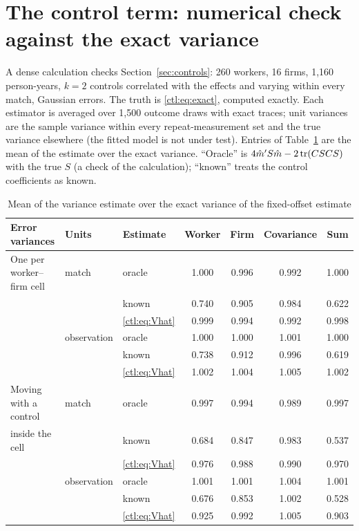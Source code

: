\section{The control term: numerical check against the exact variance}\label{app:ctlnum}

A dense calculation checks Section~\ref{sec:controls}: 260 workers, 16 firms, 1{,}160 person-years, $k=2$ controls
correlated with the effects and varying within every match, Gaussian errors. The truth is \eqref{ctl:eq:exact},
computed exactly. Each estimator is averaged over 1{,}500 outcome draws with exact traces; unit variances are the
sample variance within every repeat-measurement set and the true variance elsewhere (the fitted model is not under
test). Entries of Table~\ref{tab:ctlnum} are the mean of the estimate over the exact variance. ``Oracle'' is
$4\hat m'S\hat m-2\operatorname{tr}(CSCS)$ with the true $S$ (a check of the calculation); ``known'' treats the control
coefficients as known.

\begin{table}[H]
\centering\small
\caption{Mean of the variance estimate over the exact variance of the fixed-offset estimate}\label{tab:ctlnum}
\begin{tabular}{@{}lllcccc@{}}
\toprule
Error variances & Units & Estimate & Worker & Firm & Covariance & Sum \\
\midrule
One per worker--firm cell & match & oracle & 1.000 & 0.996 & 0.992 & 1.000 \\
 & & known & 0.740 & 0.905 & 0.984 & 0.622 \\
 & & \eqref{ctl:eq:Vhat} & 0.999 & 0.994 & 0.992 & 0.998 \\
\addlinespace
 & observation & oracle & 1.000 & 1.000 & 1.001 & 1.000 \\
 & & known & 0.738 & 0.912 & 0.996 & 0.619 \\
 & & \eqref{ctl:eq:Vhat} & 1.002 & 1.004 & 1.005 & 1.002 \\
\addlinespace
Moving with a control & match & oracle & 0.997 & 0.994 & 0.989 & 0.997 \\
\quad inside the cell & & known & 0.684 & 0.847 & 0.983 & 0.537 \\
 & & \eqref{ctl:eq:Vhat} & 0.976 & 0.988 & 0.990 & 0.970 \\
\addlinespace
 & observation & oracle & 1.001 & 1.001 & 1.004 & 1.001 \\
 & & known & 0.676 & 0.853 & 1.002 & 0.528 \\
 & & \eqref{ctl:eq:Vhat} & 0.925 & 0.992 & 1.005 & 0.903 \\
\bottomrule
\end{tabular}
\end{table}

